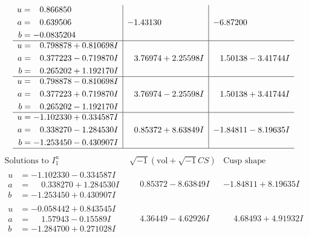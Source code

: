 \documentclass[1p]{elsarticle_modified}
\theoremstyle{definition}
\newcommand{\I}{\sqrt{-1}}
\begin{document}
$$\begin{array}{c|c|c}
\begin{aligned}
u &= \phantom{-}0.866850\phantom{ +0.000000I} \\
a &= \phantom{-}0.639506\phantom{ +0.000000I} \\
b &= -0.0835204\phantom{ +0.000000I}\end{aligned}
 & -1.43130\phantom{ +0.000000I} & -6.87200\phantom{ +0.000000I} \\ \hline\begin{aligned}
u &= \phantom{-}0.798878 + 0.810698 I \\
a &= \phantom{-}0.377223 - 0.719870 I \\
b &= \phantom{-}0.265202 + 1.192170 I\end{aligned}
 & \phantom{-}3.76974 + 2.25598 I & \phantom{-}1.50138 - 3.41744 I \\ \hline\begin{aligned}
u &= \phantom{-}0.798878 - 0.810698 I \\
a &= \phantom{-}0.377223 + 0.719870 I \\
b &= \phantom{-}0.265202 - 1.192170 I\end{aligned}
 & \phantom{-}3.76974 - 2.25598 I & \phantom{-}1.50138 + 3.41744 I \\ \hline\begin{aligned}
u &= -1.102330 + 0.334587 I \\
a &= \phantom{-}0.338270 - 1.284530 I \\
b &= -1.253450 - 0.430907 I\end{aligned}
 & \phantom{-}0.85372 + 8.63849 I & -1.84811 - 8.19635 I\\
 \hline 
 \end{array}$$\newpage$$\begin{array}{c|c|c}  
\text{Solutions to }I^u_{1}& \I (\text{vol} + \sqrt{-1}CS) & \text{Cusp shape}\\
 \hline 
\begin{aligned}
u &= -1.102330 - 0.334587 I \\
a &= \phantom{-}0.338270 + 1.284530 I \\
b &= -1.253450 + 0.430907 I\end{aligned}
 & \phantom{-}0.85372 - 8.63849 I & -1.84811 + 8.19635 I \\ \hline\begin{aligned}
u &= -0.058442 + 0.843545 I \\
a &= \phantom{-}1.57943 - 0.15589 I \\
b &= -1.284700 + 0.271028 I\end{aligned}
 & \phantom{-}4.36449 - 4.62926 I & \phantom{-}4.68493 + 4.91932 I \\ \hline\begin{aligned}

\end{aligned}
\end{array}$$
\end{document}
